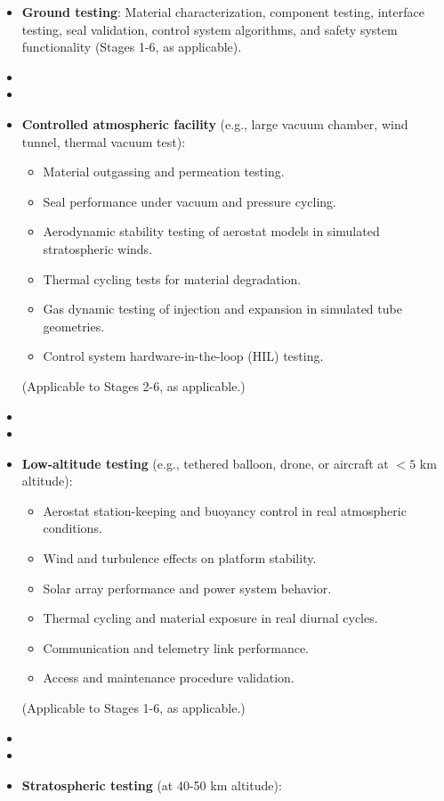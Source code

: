 \begin{itemize}
    \item \textbf{Ground testing}: Material characterization, component testing, interface testing, seal validation, control system algorithms, and safety system functionality (Stages 1-6, as applicable).
    \item \item \item \textbf{Controlled atmospheric facility} (e.g., large vacuum chamber, wind tunnel, thermal vacuum test):
        \begin{itemize}
            \item Material outgassing and permeation testing.
            \item Seal performance under vacuum and pressure cycling.
            \item Aerodynamic stability testing of aerostat models in simulated stratospheric winds.
            \item Thermal cycling tests for material degradation.
            \item Gas dynamic testing of injection and expansion in simulated tube geometries.
            \item Control system hardware-in-the-loop (HIL) testing.
        \end{itemize}
        (Applicable to Stages 2-6, as applicable.)
    \item \item \item \textbf{Low-altitude testing} (e.g., tethered balloon, drone, or aircraft at $< 5$ km altitude):
        \begin{itemize}
            \item Aerostat station-keeping and buoyancy control in real atmospheric conditions.
            \item Wind and turbulence effects on platform stability.
            \item Solar array performance and power system behavior.
            \item Thermal cycling and material exposure in real diurnal cycles.
            \item Communication and telemetry link performance.
            \item Access and maintenance procedure validation.
        \end{itemize}
        (Applicable to Stages 1-6, as applicable.)
    \item \item \item \textbf{Stratospheric testing} (at 40-50 km altitude):

\end{itemize}
